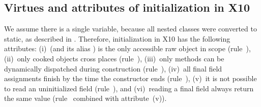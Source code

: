 \subsection{Virtues and attributes of initialization in X10}
We assume there is a single \this variable, because all nested classes were converted to static,
    as described in .
Therefore, initialization in X10 has the following attributes:
(i)~\this (and its alias ) is the only accessible raw object in scope (rule~),
(ii)~only cooked objects cross places (rule~),
(iii)~only  methods can be dynamically dispatched during construction (rule~),
(iv)~all final field assignments finish by the time the constructor ends (rule~),
(v)~it is not possible to read an uninitialized field (rule~), and
(vi)~reading a final field always return the same value (rule~ combined with attribute~(v)).

